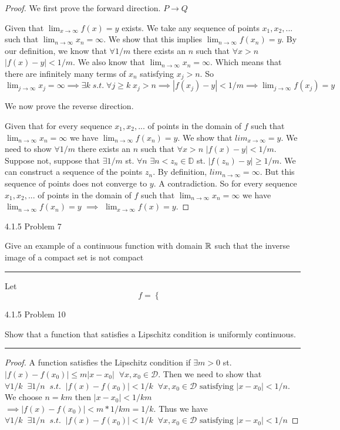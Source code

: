 \documentclass[11pt]{article}
\renewcommand{\sp}{\; \;}
\begin{document}
\begin{proof}

We first prove the forward direction. $P \to Q$

Given that $\lim_{x \to \infty} f(x) = y$ exists. We take any sequence of points $x_1, x_2, ...$ such that $\lim_{n \to \infty} x_n = \infty$. We show that this implies $\lim_{n \to \infty} f(x_n) = y$. By our definition, we know that $\forall 1/m$ there exists an $n$ such that $\forall x > n$ $|f(x) - y| < 1/m$. We also know that $\lim_{n \to \infty} x_n = \infty$. Which means that there are infinitely many terms of $x_n$ satisfying $x_j > n$. So $\lim_{j \to \infty} x_j = \infty \implies \exists k \; s.t. \; \forall j \geq k \; x_j > n \implies |f(x_j) - y| < 1/m \implies \lim_{j \to \infty} f(x_j) = y$

We now prove the reverse direction.

Given that for every sequence $x_1, x_2, ...$ of points in the domain of $f$ such that $\lim_{n \to \infty} x_n = \infty$ we have $\lim_{n\to \infty} f(x_n) = y$. 
We show that $lim_{x \to \infty} = y$. We need to show $\forall 1/m$ there exists an $n$ such that $\forall x > n$ $|f(x) - y| < 1/m$. 
Suppose not, suppose that $\exists 1/m$ st. $\forall n$ $\exists n < z_n \in \mathbb{D}$ st. $|f(z_n) - y| \geq 1/m$. We can construct a sequence of the points $z_n$. By definition, $lim_{n \to \infty} = \infty$. But this sequence of points does not converge to $y$. A contradiction. So for every sequence $x_1, x_2, ...$ of points in the domain of $f$ such that $\lim_{n \to \infty} x_n = \infty$ we have $\lim_{n\to \infty} f(x_n) = y$ $\implies$ $\lim_{x \to \infty} f(x) = y$.

\end{proof}



\newpage
{} 4.1.5 Problem 7

Give an example of a continuous function with domain $\mathbb{R}$ such that the inverse image of a compact set is not compact

\hrule


Let $$f = \begin{cases}

\end{cases}
$$



\newpage
{} 4.1.5 Problem 10

Show that a function that satisfies a Lipschitz condition is uniformly continuous.
\hrule


\begin{proof}

A function satisfies the Lipschitz condition if $\exists m > 0$ st. $|f(x) - f(x_0) | \leq m |x-x_0| \sp \forall x, x_0 \in \mathcal{D}$. 
Then we need to show that $\forall 1/k \sp \exists 1/n \sp s.t. \sp |f(x) - f(x_0)| < 1/k \sp \forall x, x_0 \in \mathcal{D} \text{ satisfying } |x-x_0| < 1/n$. 
We choose $n = k m$ then $|x - x_0| < 1/km$ $\implies |f(x) - f(x_0)| < m * 1/km = 1/k$. 
Thus we have  $\forall 1/k \sp \exists 1/n \sp s.t. \sp |f(x) - f(x_0)| < 1/k \sp \forall x, x_0 \in \mathcal{D} \text{ satisfying } |x-x_0| < 1/n$

\end{proof}
\end{document}
